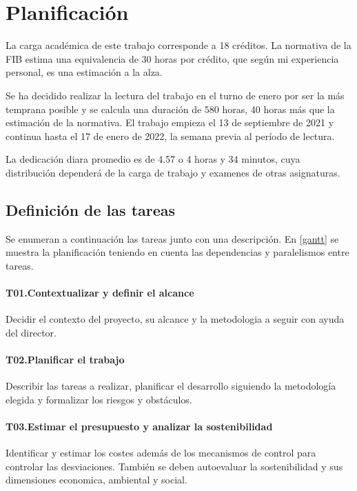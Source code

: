 
\chapter{Planificación}\label{desctasks}
La carga académica de este trabajo corresponde a 18 créditos. La normativa
de la FIB estima una equivalencia de 30 horas por crédito, que según mi experiencia
personal, es una estimación a la alza.

Se ha decidido realizar la lectura del trabajo en el turno de enero por ser la más
temprana posible y se calcula una duración de 580 horas, 40 horas más que la
estimación de la normativa. El trabajo empieza el 13 de septiembre
de 2021 y continua hasta el 17 de enero de 2022, la semana previa al período de lectura.

La dedicación diara promedio es de 4.57 o 4 horas y 34 minutos, cuya distribución dependerá
de la carga de trabajo y examenes de otras asignaturas.

\section{Definición de las tareas}
Se enumeran a continuación las tareas junto con una descripción. En \ref{gantt} se muestra la planificación teniendo
en cuenta las dependencias y paralelismos entre tareas.
\subsubsection{T01.\quad Contextualizar y definir el alcance}\label{T01}
Decidir el contexto del proyecto, su alcance y la metodologia a seguir con ayuda
del director.
\subsubsection{T02.\quad Planificar el trabajo}\label{T02}
Describir las tareas a realizar, planificar el desarrollo siguiendo la
metodología elegida y formalizar los riesgos y obstáculos.
\subsubsection{T03.\quad Estimar el presupuesto y analizar la sostenibilidad}\label{T03}
Identificar y estimar los costes además de los mecanismos de control para controlar las
desviaciones. También se deben autoevaluar la sostenibilidad y sus dimensiones economica,
ambiental y social.

